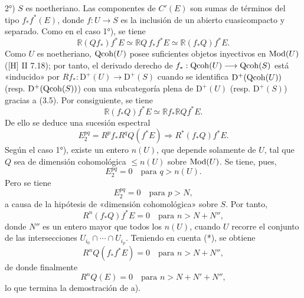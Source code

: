 2°) $S$ es noetheriano. Las componentes de $C'(E)$ son sumas de términos del tipo $f_*f^*(E)$, donde $f:U\longrightarrow S$ es la inclusión de un abierto cuasicompacto y separado. Como en el caso 1°), se tiene
\begin{equation}\tag{*}
 \mathbb R(Qf_*)f^*E\simeq \mathbb RQ\,f_*f^*E\simeq \mathbb R(f_*Q)f^*E.
\end{equation}
Como $U$ es noetheriano, $\operatorname{Qcoh}(U)$ posee suficientes objetos inyectivos en $\operatorname{Mod}(U)$ ([H] II 7.18); por tanto, el derivado derecho de $f_*:\operatorname{Qcoh}(U)\longrightarrow\operatorname{Qcoh}(S)$ está «inducido» por $Rf_*:\mathrm D^+(U)\longrightarrow\mathrm D^+(S)$ cuando se identifica $\mathrm D^+(\operatorname{Qcoh}(U))$ (resp. $\mathrm D^+(\operatorname{Qcoh}(S))$) con una subcategoría plena de $\mathrm D^+(U)$ (resp. $\mathrm D^+(S)$) gracias a (3.5). Por consiguiente, se tiene
\[
 \mathbb R(f_*Q)f^*E\simeq \mathbb Rf_*\mathbb RQf^*E.
\]
De ello se deduce una sucesión espectral
\[
 E_2^{pq}=R^pf_*R^qQ(f^*E)\Longrightarrow R^{*}(f_*Q)f^*E.
\]
Según el caso 1°), existe un entero $n(U)$, que depende solamente de $U$, tal que $Q$ sea de dimensión cohomológica $\leq n(U)$ sobre $\operatorname{Mod}(U)$. Se tiene, pues,
\[
 E_2^{pq}=0\quad\text{para }q>n(U).
\]
Pero se tiene
\[
 E_2^{pq}=0\quad\text{para }p>N,
\]
a causa de la hipótesis de «dimensión cohomológica» sobre $S$. Por tanto,
\[
 R^n(f_*Q)f^*E=0\quad\text{para }n>N+N'',
\]
donde $N''$ es un entero mayor que todos los $n(U)$, cuando $U$ recorre el conjunto de las intersecciones $U_{i_0}\cap\cdots\cap U_{i_p}$. Teniendo en cuenta (*), se obtiene
\[
 R^nQ(f_*f^*E)=0\quad\text{para }n>N+N'',
\]
de donde finalmente
\[
 R^nQ(E)=0\quad\text{para }n>N+N'+N'',
\]
lo que termina la demostración de a).
